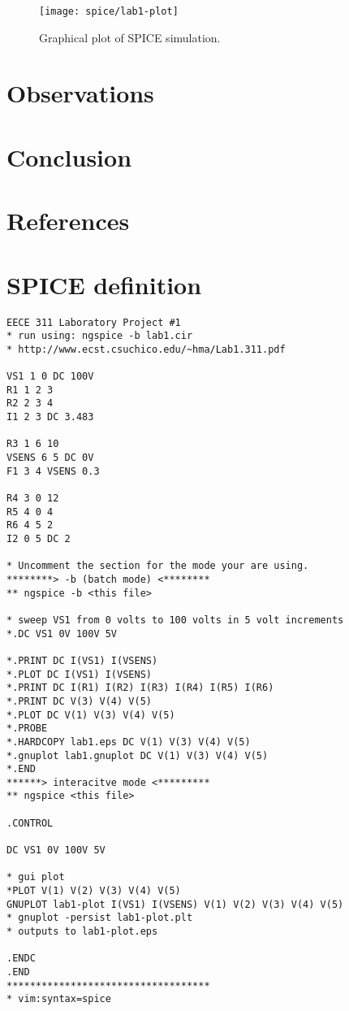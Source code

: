 \documentclass{article}
\begin{document}
\begin{figure}[!hbtp]
\center
\texttt{[image: spice/lab1-plot]}
\caption{Graphical plot of SPICE simulation.}
\label{fig:spiceguiplot}
\end{figure}

\clearpage

\section{Observations}

\section{Conclusion}

\clearpage

\pagebreak
\renewcommand*{\refname}{\vspace{-8mm}}
\section{References}



\appendix


\section{SPICE definition}\label{sec:spicedef}

{\footnotesize
\begin{verbatim}
EECE 311 Laboratory Project #1
* run using: ngspice -b lab1.cir
* http://www.ecst.csuchico.edu/~hma/Lab1.311.pdf

VS1 1 0 DC 100V
R1 1 2 3
R2 2 3 4
I1 2 3 DC 3.483

R3 1 6 10
VSENS 6 5 DC 0V
F1 3 4 VSENS 0.3

R4 3 0 12
R5 4 0 4
R6 4 5 2
I2 0 5 DC 2

* Uncomment the section for the mode your are using.
********> -b (batch mode) <********
** ngspice -b <this file>

* sweep VS1 from 0 volts to 100 volts in 5 volt increments
*.DC VS1 0V 100V 5V

*.PRINT DC I(VS1) I(VSENS)
*.PLOT DC I(VS1) I(VSENS)
*.PRINT DC I(R1) I(R2) I(R3) I(R4) I(R5) I(R6)
*.PRINT DC V(3) V(4) V(5)
*.PLOT DC V(1) V(3) V(4) V(5)
*.PROBE
*.HARDCOPY lab1.eps DC V(1) V(3) V(4) V(5)
*.gnuplot lab1.gnuplot DC V(1) V(3) V(4) V(5)
*.END
******> interacitve mode <*********
** ngspice <this file>

.CONTROL

DC VS1 0V 100V 5V

* gui plot
*PLOT V(1) V(2) V(3) V(4) V(5)
GNUPLOT lab1-plot I(VS1) I(VSENS) V(1) V(2) V(3) V(4) V(5)
* gnuplot -persist lab1-plot.plt
* outputs to lab1-plot.eps

.ENDC
.END
***********************************
* vim:syntax=spice

\end{verbatim}
}

\end{document}
